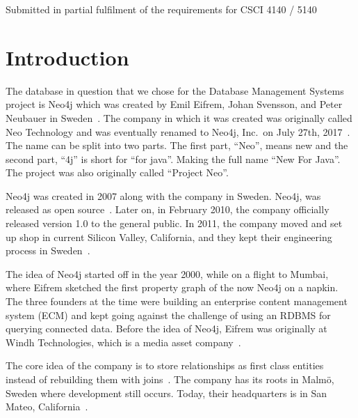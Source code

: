 \documentclass[10pt,a4paper,twocolumn]{article}
\begin{document}
\begin{titlepage}
\vspace{1.2cm}

{\small Submitted in partial fulfilment of the requirements for CSCI 4140 / 5140 \par}

\vspace{0.5cm}

\end{titlepage}

\clearpage
{}
\tableofcontents
\clearpage
\listoftables
\clearpage
\lstlistoflistings
\clearpage
{}

\section{Introduction}

The database in question that we chose for the Database Management Systems project is Neo4j which was created by Emil Eifrem, Johan Svensson, and Peter Neubauer in Sweden~\cite{wikipedia2026neo4j}. The company in which it was created was originally called Neo Technology and was eventually renamed to Neo4j, Inc.\ on July 27th, 2017~\cite{eifrem2017helloworld}. The name can be split into two parts. The first part, ``Neo'', means new and the second part, ``4j'' is short for ``for java''. Making the full name ``New For Java''. The project was also originally called ``Project Neo''.

Neo4j was created in 2007 along with the company in Sweden. Neo4j, was released as open source~\cite{wikipedia2026neo4j,dbdb2026neo4j}. Later on, in February 2010, the company officially released version 1.0 to the general public. In 2011, the company moved and set up shop in current Silicon Valley, California, and they kept their engineering process in Sweden~\cite{wikipedia2026neo4j,dbdb2026neo4j}.

The idea of Neo4j started off in the year 2000, while on a flight to Mumbai, where Eifrem sketched the first property graph of the now Neo4j on a napkin. The three founders at the time were building an enterprise content management system (ECM) and kept going against the challenge of using an RDBMS for querying connected data. Before the idea of Neo4j, Eifrem was originally at Windh Technologies, which is a media asset company~\cite{baer2019eifrem}.

The core idea of the company is to store relationships as first class entities instead of rebuilding them with joins~\cite{dbdb2026neo4j}. The company has its roots in Malmö, Sweden where development still occurs. Today, their headquarters is in San Mateo, California~\cite{oresund2016neo}.
\end{document}
